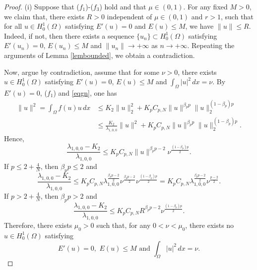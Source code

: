 \documentclass[10pt,a4paper]{amsart}
\newcommand{\norm}[1]{\lVert#1\rVert}
\begin{document}
\begin{proof}
    (i) Suppose that ($f_1$)-($f_3$) hold and that $\mu \in (0,1)$. For any fixed $M>0$, we claim that, there exists $R>0$ independent of $\mu \in (0,1)$ and $r>1$, such that for all  $u \in H_0^1(\Omega)$ satisfying $E'(u) = 0$ and $E(u)\leq M$, we have $\norm{u}\leq R$. Indeed, if not, then there exists a sequence $\{u_n\}\subset H_0^1(\Omega)$ satisfying $E'(u_n) = 0$, $E(u_n)\leq M$
    and $\norm{u_n} \to +\infty$ as $n \to +\infty$. Repeating the arguments of Lemma \ref{lembounded}, we obtain a contradiction.

    Now, argue by contradiction, assume that for some $\nu>0$, there exists $u \in H_0^1(\Omega)$ satisfying $E'(u) = 0$, $E(u)\leq M$ and $\int_{\Omega}|u|^2\,dx=\nu$. By $E'(u) = 0$, ($f_1$) and \eqref{eqgn}, one has
    \begin{equation*}\label{lemnonex}
        \begin{aligned}
        \norm{u}^2 = \int_\Omega f(u)u\,dx &\leq K_2 \norm{u}_2^2+K_{p} C_{p,N}\norm{u}^{\beta_{p}{p}}\norm{u}_2^{(1-\beta_{p}){p}} \\
        &\leq \frac{K_2}{\lambda_{1,0,0}} \norm{u}^2+K_{p} C_{p,N}\norm{u}^{\beta_{p}{p}}\norm{u}_2^{(1-\beta_{p}){p}}.
        \end{aligned}
    \end{equation*}
    Hence,
    \begin{equation*}
    \frac{\lambda_{1,0,0}-K_2}{\lambda_{1,0,0}}\leq K_{p} C_{p,N}\norm{u}^{\beta_{p}{p}-2}\nu^\frac{(1-\beta_{p}){p}}{2}.
    \end{equation*}
    If $p \leq 2+\frac{4}{N}$, then $\beta_pp\leq 2$ and
    $$
    \frac{\lambda_{1,0,0}-K_2}{\lambda_{1,0,0}}\leq K_{p} C_{p,N}\lambda_{1,0,0}^\frac{{\beta_{p}{p}-2}}{2}\nu^\frac{{\beta_{p}{p}-2}}{2} \nu^\frac{(1-\beta_{p}){p}}{2}=K_{p} C_{p,N} \lambda_{1,0,0}^\frac{{\beta_{p}{p}-2}}{2}\nu^\frac{p-2}{2}.
    $$
     If $p > 2+\frac{4}{N}$, then $\beta_pp > 2$ and
    $$
    \frac{\lambda_{1,0,0}-K_2}{\lambda_{1,0,0}}\leq K_{p} C_{p,N}R^{\beta_{p}{p}-2} \nu^\frac{(1-\beta_{p}){p}}{2}.
    $$
    Therefore, there exists $\mu_0>0$ such that, for any $0<\nu<\mu_0$, there exists no $u \in H_0^1(\Omega)$ satisfying
     $$
     E'(u) = 0,\,\,E(u)\leq M\,\,\text{and}\,\,\int_{\Omega}|u|^2 \,dx=\nu.
     $$



\end{proof}
\end{document}
